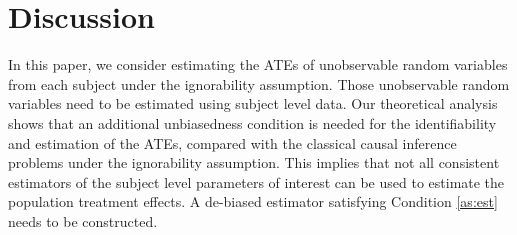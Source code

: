 \documentclass[12pt]{article}
\theoremstyle{definition}
\begin{document}
		


\setcounter{equation}{0}
\section{Discussion}\label{se:discussion}

In this paper, we consider estimating the ATEs of unobservable random variables from each subject under the ignorability assumption. Those unobservable random variables need to be estimated using subject level data. 
Our theoretical analysis shows that an additional unbiasedness condition is needed for the identifiability and estimation of the ATEs, compared with the classical causal inference problems under the ignorability assumption.
This implies that not all consistent estimators of the subject level parameters of interest can be used to estimate the population treatment effects. A de-biased estimator satisfying Condition \ref{as:est} needs to be constructed. 
\end{document}
